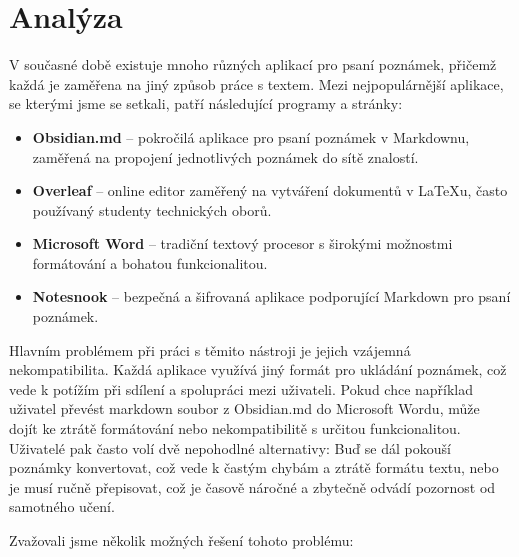 \section{Analýza}

V současné době existuje mnoho různých aplikací pro psaní poznámek, přičemž
každá je zaměřena na jiný způsob práce s textem. Mezi nejpopulárnější aplikace,
se kterými jsme se setkali, patří následující programy a stránky:

\begin{itemize}
	\item \textbf{Obsidian.md} -- pokročilá aplikace pro psaní poznámek v Markdownu, zaměřená na
	      propojení jednotlivých poznámek do sítě znalostí.
	\item \textbf{Overleaf} -- online editor zaměřený na vytváření dokumentů v LaTeXu, často
	      používaný studenty technických oborů.
	\item \textbf{Microsoft Word} -- tradiční textový procesor s širokými možnostmi formátování a
	      bohatou funkcionalitou.
	\item \textbf{Notesnook} -- bezpečná a šifrovaná aplikace podporující Markdown pro psaní
	      poznámek.
\end{itemize}

Hlavním problémem při práci s těmito nástroji je jejich vzájemná
nekompatibilita. Každá aplikace využívá jiný formát pro ukládání poznámek, což
vede k potížím při sdílení a spolupráci mezi uživateli. Pokud chce například
uživatel převést markdown soubor z Obsidian.md do Microsoft Wordu, může dojít
ke ztrátě formátování nebo nekompatibilitě s určitou funkcionalitou. Uživatelé
pak často volí dvě nepohodlné alternativy: Buď se dál pokouší poznámky
konvertovat, což vede k častým chybám a ztrátě formátu textu, nebo je musí
ručně přepisovat, což je časově náročné a zbytečně odvádí pozornost od
samotného učení.

Zvažovali jsme několik možných řešení tohoto problému:

